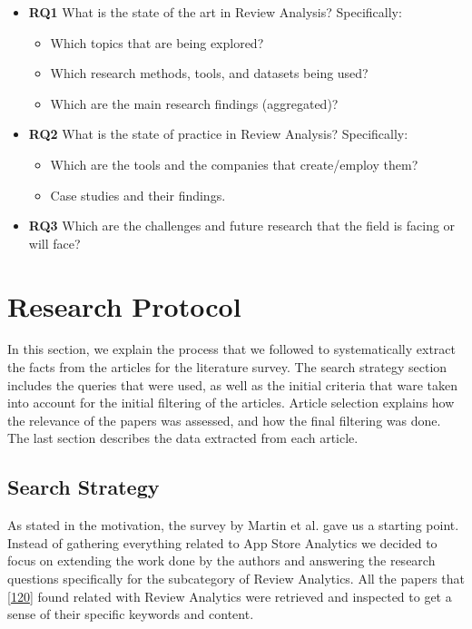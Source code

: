 \documentclass[]{book}
\providecommand{\tightlist}{%
  \setlength{\itemsep}{0pt}\setlength{\parskip}{0pt}}
\begin{document}
\begin{itemize}
\tightlist
\item
  \textbf{RQ1} What is the state of the art in Review Analysis?
  Specifically:

  \begin{itemize}
  \tightlist
  \item
    Which topics that are being explored?
  \item
    Which research methods, tools, and datasets being used?
  \item
    Which are the main research findings (aggregated)?
  \end{itemize}
\item
  \textbf{RQ2} What is the state of practice in Review Analysis?
  Specifically:

  \begin{itemize}
  \tightlist
  \item
    Which are the tools and the companies that create/employ them?
  \item
    Case studies and their findings.
  \end{itemize}
\item
  \textbf{RQ3} Which are the challenges and future research that the
  field is facing or will face?
\end{itemize}

\section{Research Protocol}\label{research-protocol-6}

In this section, we explain the process that we followed to
systematically extract the facts from the articles for the literature
survey. The search strategy section includes the queries that were used,
as well as the initial criteria that ware taken into account for the
initial filtering of the articles. Article selection explains how the
relevance of the papers was assessed, and how the final filtering was
done. The last section describes the data extracted from each article.

\subsection{Search Strategy}\label{search-strategy-2}

As stated in the motivation, the survey by Martin et al. gave us a
starting point. Instead of gathering everything related to App Store
Analytics we decided to focus on extending the work done by the authors
and answering the research questions specifically for the subcategory of
Review Analytics. All the papers that
{[}\protect\hyperlink{ref-martin2015survey}{120}{]} found related with
Review Analytics were retrieved and inspected to get a sense of their
specific keywords and content.
\end{document}
